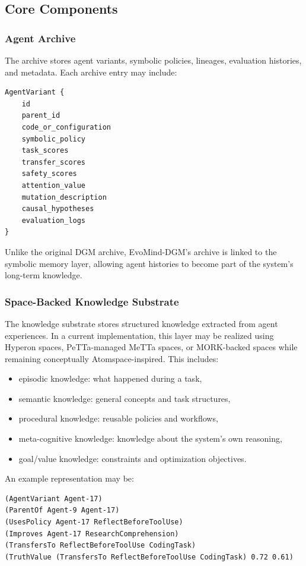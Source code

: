 \documentclass[11pt]{article}
\begin{document}
\subsection{Core Components}

\subsubsection{Agent Archive}

The archive stores agent variants, symbolic policies, lineages, evaluation histories, and metadata. Each archive entry may include:

\begin{verbatim}
AgentVariant {
    id
    parent_id
    code_or_configuration
    symbolic_policy
    task_scores
    transfer_scores
    safety_scores
    attention_value
    mutation_description
    causal_hypotheses
    evaluation_logs
}
\end{verbatim}

Unlike the original DGM archive, EvoMind-DGM's archive is linked to the symbolic memory layer, allowing agent histories to become part of the system's long-term knowledge.

\subsubsection{Space-Backed Knowledge Substrate}

The knowledge substrate stores structured knowledge extracted from agent experiences. In a current implementation, this layer may be realized using Hyperon spaces, PeTTa-managed MeTTa spaces, or MORK-backed spaces while remaining conceptually Atomspace-inspired. This includes:

\begin{itemize}[leftmargin=*]
    \item episodic knowledge: what happened during a task,
    \item semantic knowledge: general concepts and task structures,
    \item procedural knowledge: reusable policies and workflows,
    \item meta-cognitive knowledge: knowledge about the system's own reasoning,
    \item goal/value knowledge: constraints and optimization objectives.
\end{itemize}

An example representation may be:

\begin{verbatim}
(AgentVariant Agent-17)
(ParentOf Agent-9 Agent-17)
(UsesPolicy Agent-17 ReflectBeforeToolUse)
(Improves Agent-17 ResearchComprehension)
(TransfersTo ReflectBeforeToolUse CodingTask)
(TruthValue (TransfersTo ReflectBeforeToolUse CodingTask) 0.72 0.61)
\end{verbatim}
\end{document}
